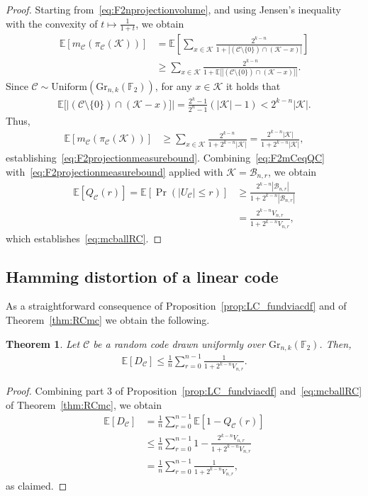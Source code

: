 \documentclass[article,doublecolumn]{IEEEtran}
\newcommand{\F}{{\mathbb{F}}}
\newcommand{\EE}{{\mathbb{E}}}
\newcommand{\BB}{{\mathcal{B}}}
\newcommand{\CC}{{\mathcal{C}}}
\newcommand{\Gr}{{\mathrm{Gr}}}
\newcommand{\Unif}{\mathrm{Uniform}}
\newcommand{\KK}{{\mathcal{K}}}
\newtheorem{thm}{Theorem}[section]
\begin{document}
\begin{proof}
Starting from~\eqref{eq:F2nprojectionvolume}, and using Jensen's inequality with the convexity of $t\mapsto \frac{1}{1+t}$, we obtain
\begin{align}
\EE[m_{\CC}(\pi_{\CC}(\KK))]&=\EE\left[\sum_{x\in\KK}\frac{2^{k-n}}{1+|(\CC\setminus\{0\})\cap (\KK-x)|}  \right]   \\
&\geq \sum_{x\in\KK}\frac{2^{k-n}}{1+\EE[|(\CC\setminus\{0\})\cap (\KK-x)]|}.\label{eq:rondomcodebeforeexpectation}
\end{align}
Since $\CC\sim\Unif(\Gr_{n,k}(\F_2))$, for any $x\in\KK$ it holds that
\begin{align}
\EE[|(\CC\setminus\{0\})\cap (\KK-x)]|=\frac{2^k-1}{2^n-1}(|\KK|-1)<2^{k-n}|\KK|.
\end{align}
Thus,
\begin{align}
\EE[m_{\CC}(\pi_{\CC}(\KK))]
&\geq \sum_{x\in\KK}\frac{2^{k-n}}{1+2^{k-n}|\KK|}=\frac{2^{k-n}|\KK|}{1+2^{k-n}|\KK|},
\end{align}
establishing~\eqref{eq:F2projectionmeasurebound}. Combining~\eqref{eq:F2mCeqQC} with~\eqref{eq:F2projectionmeasurebound} applied with $\KK=\BB_{n,r}$, we obtain
\begin{align}
\EE[Q_\CC(r)]=\EE[\Pr(|U_\CC|\leq  r)]&\geq \frac{2^{k-n}|\BB_{n,r}|}{1+2^{k-n}|\BB_{n,r}|}\\
&=\frac{2^{k-n}V_{n,r}}{1+2^{k-n}V_{n,r}},
\end{align}
which establishes~\eqref{eq:mcballRC}.
\end{proof}


\subsection{Hamming distortion of a linear code}

As a straightforward consequence of Proposition~\ref{prop:LC_fundviacdf} and of Theorem~\ref{thm:RCmc} we obtain the following.

\begin{thm}
Let $\CC$ be a random code drawn uniformly over $\Gr_{n,k}(\F_2)$. Then,   \begin{align}
\EE[D_\CC]\leq \frac{1}{n}\sum_{r=0}^{n-1}\frac{1}{1+2^{k-n}V_{n,r}}.  
\end{align}
\label{thm:DCLN}
\end{thm}

\begin{proof}
Combining part 3 of Proposition~\ref{prop:LC_fundviacdf} and~\eqref{eq:mcballRC} of Theorem~\ref{thm:RCmc}, we obtain
\begin{align}
\EE[D_\CC]&=\frac{1}{n}\sum_{r=0}^{n-1
}\EE[1-Q_\CC(r)]\\
&\leq \frac{1}{n}\sum_{r=0}^{n-1
}1-\frac{2^{k-n}V_{n,r}}{1+2^{k-n}V_{n,r}}\\
&=\frac{1}{n}\sum_{r=0}^{n-1}\frac{1}{1+2^{k-n}V_{n,r}},
\end{align}
as claimed.
\end{proof}
    
\end{document}
